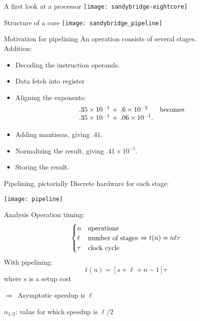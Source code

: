 \begin{numberedframe}{A first look at a processor}
  \texttt{[image: sandybridge-eightcore]}
\end{numberedframe}

\begin{numberedframe}{Structure of a core}
  \texttt{[image: sandybridge\_pipeline]}
\end{numberedframe}

\begin{numberedframe}{Motivation for pipelining}
  An operation consists of several stages.\\
  Addition:
  \begin{itemize}
\item Decoding the instruction  operands.
\item Data fetch into register
\item Aligning the exponents:
\[ 
\begin{array}{ll}
.35\times 10^{-1}\,+\, .6\times 10^{-2}&\hbox{becomes}\\
.35\times 10^{-1}\,+\, .06\times 10^{-1}.
\end{array}
\]
\item Adding mantissas, giving  $.41$.
\item Normalizing the result, giving $.41\times 10^{-1}$.
\item Storing the result.
\end{itemize}
\end{numberedframe}

\begin{numberedframe}{Pipelining, pictorially}
  Discrete hardware for each stage:
  
    \texttt{[image: pipeline]}
\end{numberedframe}

\begin{numberedframe}{Analysis}
Operation timing:
\[ 
\begin{cases}
  n&\hbox{operations}\\ \ell&\hbox{number of stages}\\ \tau&\hbox{clock cycle}
\end{cases} \Rightarrow
t(n)=n\ell\tau
\]
With pipelining:
\[ t(n)=[s+\ell+n-1]\tau \]
where $s$ is a setup cost

$\Rightarrow$~Asymptotic speedup is $\ell$

$n_{1/2}$: value for which speedup is $\ell/2$
\end{numberedframe}

